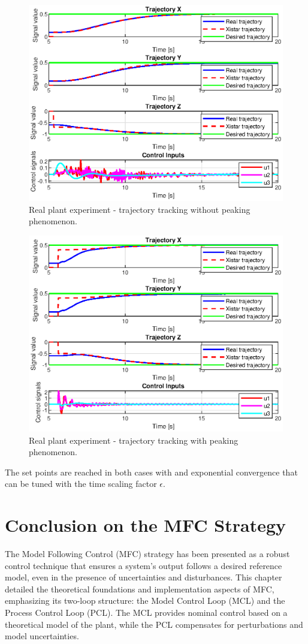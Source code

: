 \begin{figure}[htbp]
  \centering
  \includegraphics[width=0.8\linewidth]{imgs/section1/noPeaking.eps}
  \caption{Real plant experiment - trajectory tracking without peaking phenomenon.}
  \label{fig:Real_PLant_without_Peaking}
\end{figure}


\begin{figure}[htbp]
  \centering
  \includegraphics[width=0.8\linewidth]{imgs/section1/midPeaking.eps}
  \caption{Real plant experiment - trajectory tracking with peaking phenomenon.}
  \label{fig:Real_Plant_with_Peaking}
\end{figure}


The set points are reached in both cases with and exponential convergence that 
can be tuned with the time scaling factor \(\epsilon\).


\newpage
\section{Conclusion on the MFC Strategy}
The Model Following Control (MFC) strategy has been presented as a 
robust control technique that ensures a system's output follows a desired 
reference model, even in the presence of uncertainties and disturbances. 
This chapter detailed the theoretical foundations and implementation 
aspects of MFC, emphasizing its two-loop structure: the Model Control 
Loop (MCL) and the Process Control Loop (PCL). The MCL provides nominal 
control based on a theoretical model of the plant, while the PCL compensates 
for perturbations and model uncertainties.

